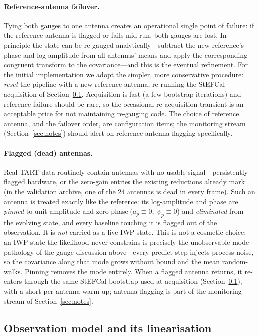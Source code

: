 \documentclass[11pt]{article}
\begin{document}
\paragraph{Reference-antenna failover.} Tying both gauges to one antenna creates an operational
single point of failure: if the reference antenna is flagged or fails mid-run, both gauges are lost.
In principle the state can be re-gauged analytically---subtract the new reference's phase and
log-amplitude from all antennas' means and apply the corresponding congruent transform to the
covariance---and this is the eventual refinement. For the initial implementation we adopt the
simpler, more conservative procedure: \emph{reset} the pipeline with a new reference antenna,
re-running the StEFCal acquisition of Section~\ref{sec:obs}. Acquisition is fast (a few bootstrap
iterations) and reference failure should be rare, so the occasional re-acquisition transient is an
acceptable price for not maintaining re-gauging code. The choice of reference antenna, and the
failover order, are configuration items; the monitoring stream (Section~\ref{sec:notes}) should
alert on reference-antenna flagging specifically.

\paragraph{Flagged (dead) antennas.} Real TART data routinely contain antennas with no usable
signal---persistently flagged hardware, or the zero-gain entries the existing reductions already
mark (in the validation archive, one of the 24 antennas is dead in every frame). Such an antenna is
treated exactly like the reference: its log-amplitude and phase are \emph{pinned} to unit amplitude
and zero phase ($a_p\equiv0,\ \psi_p\equiv0$) and \emph{eliminated} from the evolving state, and
every baseline touching it is flagged out of the observation. It is \emph{not} carried as a live IWP
state. This is not a cosmetic choice: an IWP state the likelihood never constrains is precisely the
unobservable-mode pathology of the gauge discussion above---every predict step injects process
noise, so the covariance along that mode grows without bound and the mean random-walks. Pinning
removes the mode entirely. When a flagged antenna returns, it re-enters through the same StEFCal
bootstrap used at acquisition (Section~\ref{sec:obs}), with a short per-antenna warm-up; antenna
flagging is part of the monitoring stream of Section~\ref{sec:notes}.

\subsection{Observation model and its linearisation}
\label{sec:obs}
\end{document}

